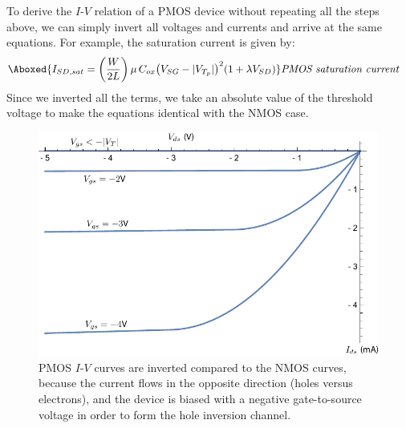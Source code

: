 To derive the $I$-$V$ relation of a PMOS device without repeating all the steps above, we can simply invert all voltages and currents and arrive at the same equations.  For example, the saturation current is given by:
    \begin{align}
        \Aboxed{ I_{SD,sat} = \left( \frac{W}{2L} \right) \mu\,C_{ox} {\big(V_{SG} - \lvert{V_{T_p}\rvert}\big)}^2 (1 + \lambda V_{SD}) } &\textit{PMOS saturation current}
    \end{align}
Since we inverted all the terms, we take an absolute value of the threshold voltage to make the equations identical with the NMOS case.
\newpage
\begin{figure}[t]
\centering
\includegraphics[width=\columnwidth]{idspmos}
\caption{PMOS $I$-$V$ curves are inverted compared to the NMOS curves, because the current flows in the opposite direction (holes versus electrons), and the device is biased with a negative gate-to-source voltage in order to form the hole inversion channel.}
\label{fig:idspmos}
\end{figure}
\vspace{1cm}
